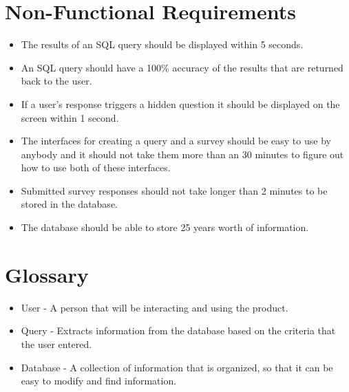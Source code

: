 \documentclass[letterpaper,10pt,titlepage, draftclsnofoot,onecolumn]{IEEEtran}
\begin{document}
\section{Non-Functional Requirements}
\begin{itemize}
\item The results of an SQL query should be displayed within 5 seconds. 
\item An SQL query should have a 100\% accuracy of the results that are returned back to the user. 
\item If a user's response triggers a hidden question it should be displayed on the screen within 1 second.
\item The interfaces for creating a query and a survey should be easy to use by anybody and it should not take them more than an 30 minutes to figure out how to use both of these interfaces. 
\item Submitted survey responses should not take longer than 2 minutes to be stored in the database. 
\item The database should be able to store 25 years worth of information. 
\end{itemize}

\section{Glossary}
\begin{itemize}
\item User - A person that will be interacting and using the product.
\item Query - Extracts information from the database based on the criteria that the user entered.
\item Database - A collection of information that is organized, so that it can be easy to modify and find information. 
\end{itemize}
\end{document}
